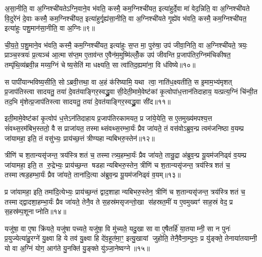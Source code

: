 अ॒सा॒नीति॒ वा अ॒ग्निश्ची॑यतेऽग्नि॒वाने॒व भ॑वति॒ कस्मै॒ कम॒ग्निश्ची॑यत॒ इत्या॑हुर्दे॒वा मा॑ वेद॒न्निति॒ वा अ॒ग्निश्ची॑यते वि॒दुरे॑नं दे॒वाः कस्मै॒ कम॒ग्निश्ची॑यत॒ इत्या॑हुर्गृ॒ह्य॑सा॒नीति॒ वा अ॒ग्निश्ची॑यते गृ॒ह्ये॑व भ॑वति॒ कस्मै॒ कम॒ग्निश्ची॑यत॒ इत्या॑हुः पशु॒मान॑सा॒नीति॒ वा अ॒ग्निः॥९॥

ची॒य॒ते॒ प॒शु॒माने॒व भ॑वति॒ कस्मै॒ कम॒ग्निश्ची॑यत॒ इत्या॑हुः स॒प्त मा॒ पुरु॑षा॒ उप॑ जीवा॒निति॒ वा अ॒ग्निश्ची॑यते॒ त्रयः॒ प्राञ्च॒स्त्रयः॑ प्र॒त्यञ्च॑ आ॒त्मा स॑प्त॒म ए॒ताव॑न्त ए॒वैन॑म॒मुष्मि॑ल्लोँ॒क उप॑ जीवन्ति प्र॒जाप॑तिर॒ग्निम॑चिकीषत॒ तम्पृ॑थि॒व्य॑ब्रवी॒न्न मय्य॒ग्निं चेष्य॒सेति॑ मा धक्ष्यति॒ सा त्वा॑तिद॒ह्यमा॑ना॒ वि ध॑विष्ये॥१०॥

स पापी॑यान्भविष्य॒सीति॒ सोऽब्रवी॒त्तथा॒ वा अ॒हं क॑रिष्यामि॒ यथा त्वा॒ नाति॑ध॒क्ष्यतीति॒ स इ॒माम॒भ्य॑मृशत् प्र॒जाप॑तिस्त्वा सादयतु॒ तया॑ दे॒वत॑याङ्गिर॒स्वद्ध्रु॒वा सी॒देती॒मामे॒वेष्ट॑कां कृ॒त्वोपा॑ध॒त्तान॑तिदाहाय॒ यत्प्रत्य॒ग्निं चि॑न्वी॒त तद॒भि मृ॑शेत्प्र॒जाप॑तिस्त्वा सादयतु॒ तया॑ दे॒वत॑याङ्गिर॒स्वद्ध्रु॒वा सी॑द॥११॥

इती॒मामे॒वेष्ट॑कां कृ॒त्वोप॑ ध॒त्तेऽन॑तिदाहाय प्र॒जाप॑तिरकामयत॒ प्र जा॑ये॒येति॒ स ए॒तमुख्य॑मपश्य॒त्त सं॑वथ्स॒रम॑बिभ॒स्ततो॒ वै स प्राजा॑यत॒ तस्माथ्संवथ्स॒रम्भा॒र्यः॑ प्रैव जा॑यते॒ तं वस॑वोऽब्रुव॒न्प्र त्वम॑जनिष्ठा व॒यम्प्र जा॑यामहा॒ इति॒ तं वसु॑भ्यः॒ प्राय॑च्छ॒त्तं त्रीण्यहान्यबिभरु॒स्तेन॑॥१२॥

त्रीणि॑ च श॒तान्यसृ॑जन्त॒ त्रय॑स्त्रिशतं च॒ तस्मात्त्र्य॒हम्भा॒र्यः॑ प्रैव जा॑यते॒ तान्रु॒द्रा अ॑ब्रुव॒न्प्र यू॒यम॑जनिढ्वं व॒यम्प्र जा॑यामहा॒ इति॒ त रु॒द्रेभ्यः॒ प्राय॑च्छ॒न्त षडहान्यबिभरु॒स्तेन॒ त्रीणि॑ च श॒तान्यसृ॑जन्त॒ त्रय॑स्त्रिशतं च॒ तस्मात्षड॒हम्भा॒र्यः॑ प्रैव जा॑यते॒ ताना॑दि॒त्या अ॑ब्रुव॒न्प्र यू॒यम॑जनिढ्वं व॒यम्॥१३॥

प्र जा॑यामहा॒ इति॒ तमा॑दि॒त्येभ्यः॒ प्राय॑च्छ॒न्तं द्वाद॒शाहान्यबिभरु॒स्तेन॒ त्रीणि॑ च श॒तान्यसृ॑जन्त॒ त्रय॑स्त्रिशतं च॒ तस्माद्द्वादशा॒हम्भा॒र्यः॑ प्रैव जा॑यते॒ तेनै॒व ते स॒हस्र॑मसृजन्तो॒खा स॑हस्रत॒मीं य ए॒वमुख्यꣳ॑ साह॒स्रं वेद॒ प्र स॒हस्र॑म्प॒शूनाप्नोति॥१४॥

{\anuvakamend[{अ॒ग्नि॒वान्प॑शु॒मान॑सा॒नीति॒ वा अ॒ग्निर्ध॑विष्ये मृशेत्प्र॒जाप॑तिस्त्वा सादयतु॒ तया॑ दे॒वत॑याङ्गिर॒स्वद्ध्रु॒वा सी॑द॒ तेन॒ ताना॑दि॒त्या अ॑ब्रुव॒न्प्र यू॒यम॑जनिढ्वं व॒यञ्च॑त्वारि॒ꣳ॒शच्च॑॥२॥}]}

यजु॑षा॒ वा ए॒षा क्रि॑यते॒ यजु॑षा पच्यते॒ यजु॑षा॒ वि मु॑च्यते॒ यदु॒खा सा वा ए॒षैतर्\mbox{}हि॑ या॒तयाम्नी॒ सा न पुनः॑ प्र॒युज्येत्या॑हु॒रग्ने॑ यु॒क्ष्वा हि ये तव॑ यु॒क्ष्वा हि दे॑व॒हूत॑मा॒ꣳ॒ इत्यु॒खायां जुहोति॒ तेनै॒वैना॒म्पुनः॒ प्र यु॑ङ्क्ते॒ तेनाया॑तयाम्नी॒ यो वा अ॒ग्निं योग॒ आग॑ते यु॒नक्ति॑ यु॒ङ्क्ते यु॑ञ्जा॒नेष्वग्ने॥१५॥

